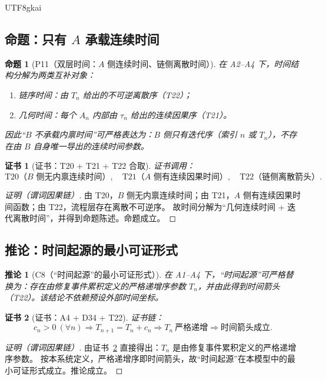 \documentclass[12pt]{article}
\newtheorem{proposition}{命题}[section]
\newtheorem{corollary}{推论}[section]
\newtheorem{Certificate}{证书}[section]
\begin{document}
\begin{CJK*}{UTF8}{gkai}
\subsection{命题：只有 $A$ 承载连续时间}

\begin{proposition}[P11（双层时间：$A$ 侧连续时间、链侧离散时间）]
\label{prop:P11}
在 A2--A4 下，时间结构分解为两类互补对象：
\begin{enumerate}
\item 链序时间：由 $T_n$ 给出的不可逆离散序（T22）；
\item 几何时间：每个 $A_n$ 内部由 $\tau_n$ 给出的连续因果序（T21）。
\end{enumerate}
因此“$B$ 不承载内禀时间”可严格表达为：$B$ 侧只有迭代序（索引 $n$ 或 $T_n$），不存在由 $B$ 自身唯一导出的连续时间参数。
\end{proposition}

\begin{Certificate}[证书：T20 + T21 + T22 合取]
\label{cert:P11}
证书调用：
\[
\text{T20（$B$ 侧无内禀连续时间）},
\quad
\text{T21（$A$ 侧有连续因果时间）},
\quad
\text{T22（链侧离散箭头）}.
\]
\end{Certificate}

\begin{proof}[证明（谓词因果链）]
由 T20，$B$ 侧无内禀连续时间；由 T21，$A$ 侧有连续因果时间函数；由 T22，流程层存在离散不可逆序。
故时间分解为“几何连续时间 + 迭代离散时间”，并得到命题陈述。命题成立。
\end{proof}

\subsection{推论：时间起源的最小可证形式}

\begin{corollary}[C8（“时间起源”的最小可证形式）]
\label{cor:C8}
在 A1--A4 下，“时间起源”可严格替换为：存在由修复事件累积定义的严格递增序参数 $T_n$，并由此得到时间箭头（T22）。该结论不依赖预设外部时间坐标。
\end{corollary}

\begin{Certificate}[证书：A4 + D34 + T22]
\label{cert:C8}
证书链：
\[
c_n>0\ (\forall n)
\Rightarrow
T_{n+1}=T_n+c_n
\Rightarrow
T_n\ \text{严格递增}
\Rightarrow
\text{时间箭头成立}.
\]
\end{Certificate}

\begin{proof}[证明（谓词因果链）]
由证书~\ref{cert:C8} 直接得出：$T_n$ 是由修复事件累积定义的严格递增序参数。
按本系统定义，严格递增序即时间箭头，故“时间起源”在本模型中的最小可证形式成立。推论成立。
\end{proof}


\end{CJK*}
\end{document}
